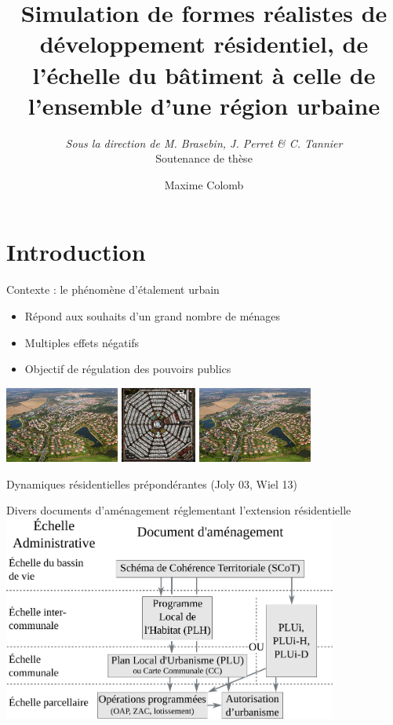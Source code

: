 \documentclass[xcolor=table]{beamer}
\title{Simulation de formes réalistes de développement résidentiel, de l'échelle du bâtiment à celle de l'ensemble d'une région urbaine}
\author{Maxime Colomb}
\subtitle{\textit{Sous la direction de M. Brasebin, J. Perret \& C. Tannier}
	\\Soutenance de thèse}
\begin{document}
\maketitle
\section{Introduction}
\begin{frame}{Contexte : le phénomène d'étalement urbain}
	\begin{block}{}
		\begin{itemize}
			\item Répond aux souhaits d'un grand nombre de ménages
			\item Multiples effets négatifs
			\item Objectif de régulation des pouvoirs publics
		\end{itemize}
		\includegraphics[height=2.5cm]{Images/consome.jpg}
		\includegraphics[height=2.5cm]{Images/sto.jpeg}
		\includegraphics[height=2.5cm]{Images/consome.jpg}
	\end{block}
	\begin{block}{}
		Dynamiques résidentielles prépondérantes (Joly 03, Wiel 13)
	\end{block}
\end{frame}

\begin{frame}{Divers documents d'aménagement réglementant l'extension résidentielle} 
	\includegraphics[width=11cm]{Images/planification-globale-Prez.png}
\end{frame}
\end{document}

